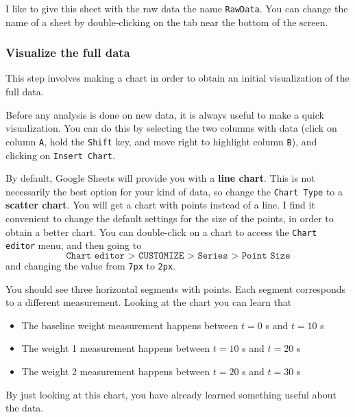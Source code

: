 I like to give this sheet with the raw data the name \texttt{RawData}. You can change the name of a sheet by double-clicking on the tab near the bottom of the screen.
%
\subsubsection{Visualize the full data}
%
This step involves making a chart in order to obtain an initial visualization of the full data.

Before any analysis is done on new data, it is always useful to make a quick visualization. You can do this by selecting the two columns with data (click on column \texttt{A}, hold the \texttt{Shift} key, and move right to highlight column \texttt{B}), and clicking on \texttt{Insert Chart}.

By default, Google Sheets will provide you with a \textbf{line chart}. This is not necessarily the best option for your kind of data, so change the \texttt{Chart Type} to a \textbf{scatter chart}. You will get a chart with points instead of a line. I find it convenient to change the default settings for the size of the points, in order to obtain a better chart. You can double-click on a chart to access the \texttt{Chart editor} menu, and then going to
\begin{equation}
    \texttt{Chart editor > CUSTOMIZE > Series > Point Size}
\end{equation}
and changing the value from \texttt{7px} to \texttt{2px}.

You should see three horizontal segments with points. Each segment corresponds to a different measurement. Looking at the chart you can learn that
\begin{itemize}
    \item The baseline weight measurement happens between $t = 0$ s and $t = 10$ s
    \item The weight 1 measurement happens between $t = 10$ s and $t = 20$ s
    \item The weight 2 measurement happens between $t = 20$ s and $t = 30$ s
\end{itemize}
By just looking at this chart, you have already learned something useful about the data.
%
\begin{center}
\end{center}
%
